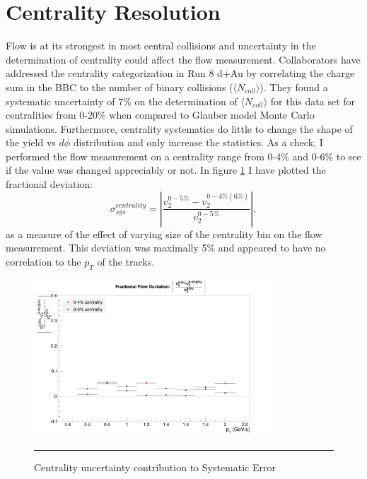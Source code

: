\section{Centrality Resolution}
\label{sectcenterr}
Flow is at its strongest in most central collisions and uncertainty in the determination of centrality could affect the flow measurement. Collaborators have addressed the centrality categorization in Run 8 d+Au\citep{phenixcentrality} by correlating the charge sum in the BBC to the number of binary collisions ($\langle N_{coll} \rangle$). They found a systematic uncertainty of 7\% on the determination of $\langle N_{coll} \rangle$ for this data set for centralities from 0-20\% when compared to Glauber model Monte Carlo simulations. Furthermore, centrality systematics do little to change the shape of the yield vs $d\phi$ distribution and only increase the statistics. As a check, I performed the flow measurement on a centrality range from 0-4\% and 0-6\% to see if the value was changed appreciably or not. In figure \ref{fig:centsys} I have plotted the fractional deviation:
\begin{equation}
\sigma_{sys}^{centrality} = \left| \frac{v_{2}^{0-5\%}-v_{2}^{0-4\%(6\%)}}{v_{2}^{0-5\%}} \right|,
\end{equation}
as a measure of the effect of varying size of the centrality bin on the flow measurement. This deviation was maximally 5\% and appeared to have no correlation to the $p_T$ of the tracks.

\begin{figure}[htbp]
  \centering
    \includegraphics[width=0.8\textwidth]{evtQA/CentSysErrs.jpg}
    \rule{35em}{0.5pt}
  \caption[Centrality uncertainty contribution to Systematic Error]{Centrality uncertainty contribution to Systematic Error}
  \label{fig:centsys}
\end{figure}

